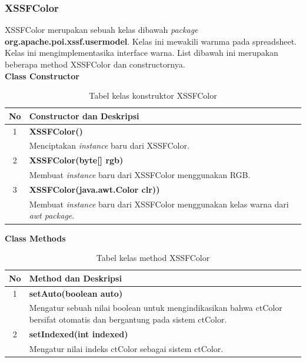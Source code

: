 \subsubsection{XSSFColor}
\label{subs:XSSFColor}
XSSFColor merupakan sebuah kelas dibawah \textit{package} \textbf{org.apache.poi.xssf.usermodel}. Kelas ini mewakili warnma pada spreadsheet. Kelas ini mengimplementasika interface warna. List dibawah ini merupakan beberapa method XSSFColor dan constructornya.\cite{apachepoi2}
\\
\noindent \textbf{Class Constructor}
\begin{table}[H]
		\centering
		\caption{Tabel kelas konstruktor XSSFColor}
		\label{tab:KonstrukXSSFColor}
	\begin{tabular}{|c|p{12cm}|}
		\hline
		\textbf{No} & \textbf{Constructor dan Deskripsi} \\ \hline \hline
		1 & \textbf{XSSFColor()}\\
			&	Menciptakan \textit{instance} baru dari XSSFColor.\\ \hline
		2 & \textbf{XSSFColor(byte[] rgb)}\\
			&	Membuat  \textit{instance} baru dari XSSFColor menggunakan RGB.\\ \hline
		3 & \textbf{XSSFColor(java.awt.Color clr))}\\
			&	Membuat  \textit{instance} baru dari XSSFColor menggunakan kelas warna dari \textit{awt package}.\\ \hline 		
	\end{tabular}
\end{table}

\noindent \textbf{Class Methods}
\begin{table}[H]
		\centering
		\caption{Tabel kelas method XSSFColor}
		\label{tab:methodXSSFColor}
	\begin{tabular}{|c|p{12cm}|}
		\hline
		\textbf{No} & \textbf{Method dan Deskripsi} \\ \hline \hline
		1 & \textbf{setAuto(boolean auto)}\\
			&	Mengatur sebuah nilai boolean untuk mengindikasikan bahwa ctColor bersifat otomatis dan bergantung pada sistem ctColor.\\ \hline
		2 & \textbf{setIndexed(int indexed)}\\
			&	Mengatur nilai indeks ctColor sebagai sistem ctColor.\\ \hline
	\end{tabular}
\end{table}

